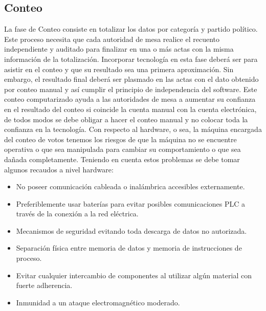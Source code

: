 \subsection{Conteo} 
La fase de Conteo consiste en totalizar los datos por categoría y partido político. Este proceso necesita que cada autoridad de mesa realice el recuento independiente y auditado para finalizar en una o más actas con la misma información de la totalización. Incorporar tecnología en esta fase deberá ser para asistir en el conteo y que su resultado sea una primera aproximación. Sin embargo, el resultado final deberá ser plasmado en las actas con el dato obtenido por conteo manual y así cumplir el principio de independencia del software. 
Este conteo computarizado ayuda a las autoridades de mesa a aumentar su confianza en el resultado del conteo si coincide la cuenta manual con la cuenta electrónica, de todos modos se debe obligar a hacer el conteo manual y no colocar toda la confianza en la tecnología.
Con respecto al hardware, o sea, la máquina encargada del conteo de votos tenemos los riesgos de que la máquina no se encuentre operativa o que sea manipulada para cambiar su comportamiento o que sea dañada completamente. Teniendo en cuenta estos problemas se debe tomar algunos recaudos a nivel hardware:
    \begin{itemize}
        \item No poseer comunicación cableada o inalámbrica accesibles externamente.
        \item Preferiblemente usar baterías para evitar posibles comunicaciones PLC a través de la conexión a la red eléctrica.
        \item Mecanismos de seguridad evitando toda descarga de datos no autorizada.
        \item Separación física entre memoria de datos y memoria de instrucciones de proceso.
        \item Evitar cualquier intercambio de componentes al utilizar algún material con fuerte adherencia.
        \item Inmunidad a un ataque electromagnético moderado.
    \end{itemize}
    
